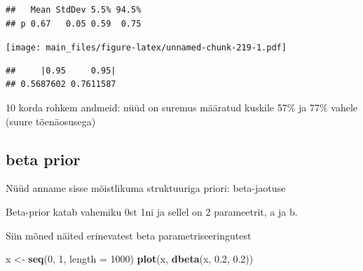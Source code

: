 \documentclass[]{book}
\newenvironment{Shaded}{\begin{snugshade}}{\end{snugshade}}
\newcommand{\KeywordTok}[1]{\textcolor[rgb]{0.13,0.29,0.53}{\textbf{#1}}}
\newcommand{\DataTypeTok}[1]{\textcolor[rgb]{0.13,0.29,0.53}{#1}}
\newcommand{\DecValTok}[1]{\textcolor[rgb]{0.00,0.00,0.81}{#1}}
\newcommand{\FloatTok}[1]{\textcolor[rgb]{0.00,0.00,0.81}{#1}}
\newcommand{\StringTok}[1]{\textcolor[rgb]{0.31,0.60,0.02}{#1}}
\newcommand{\CommentTok}[1]{\textcolor[rgb]{0.56,0.35,0.01}{\textit{#1}}}
\newcommand{\OperatorTok}[1]{\textcolor[rgb]{0.81,0.36,0.00}{\textbf{#1}}}
\newcommand{\NormalTok}[1]{#1}
\begin{document}
\begin{verbatim}
##   Mean StdDev 5.5% 94.5%
## p 0.67   0.05 0.59  0.75
\end{verbatim}

\begin{Shaded}
\end{Shaded}

\texttt{[image: main\_files/figure-latex/unnamed-chunk-219-1.pdf]}

\begin{Shaded}
\end{Shaded}

\begin{verbatim}
##     |0.95     0.95| 
## 0.5687602 0.7611587
\end{verbatim}

10 korda rohkem andmeid: nüüd on suremus määratud kuskile 57\% ja 77\%
vahele (suure tõenäosusega)

\subsection{beta prior}\label{beta-prior}

Nüüd anname sisse mõistlikuma struktuuriga priori: beta-jaotuse

Beta-prior katab vahemiku 0st 1ni ja sellel on 2 parameetrit, a ja b.

Siin mõned näited erinevatest beta parametriseeringutest

\begin{Shaded}
\begin{Highlighting}[]
\NormalTok{x <-}\StringTok{ }\KeywordTok{seq}\NormalTok{(}\DecValTok{0}\NormalTok{, }\DecValTok{1}\NormalTok{, }\DataTypeTok{length =} \DecValTok{1000}\NormalTok{)}
\KeywordTok{plot}\NormalTok{(x, }\KeywordTok{dbeta}\NormalTok{(x, }\FloatTok{0.2}\NormalTok{, }\FloatTok{0.2}\NormalTok{))}
\end{Highlighting}
\end{Shaded}
\end{document}

